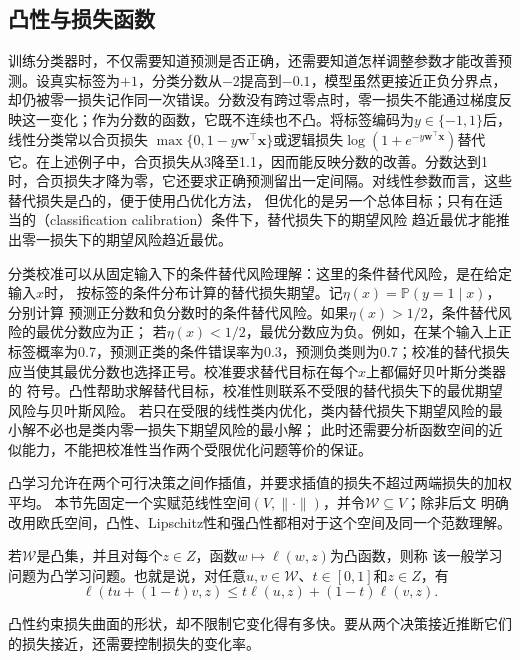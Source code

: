 \subsection{凸性与损失函数}

训练分类器时，不仅需要知道预测是否正确，还需要知道怎样调整参数才能改善预测。设真实标签为$+1$，分类分数从$-2$提高到$-0.1$，模型虽然更接近正负分界点，却仍被零一损失记作同一次错误。分数没有跨过零点时，零一损失不能通过梯度反映这一变化；作为分数的函数，它既不连续也不凸。将标签编码为$y\in\{-1,1\}$后，
线性分类常以合页损失
$\max\{0,1-y\bm w^\top\bm x\}$或逻辑损失$\log(1+e^{-y\bm w^\top\bm x})$替代它。在上述例子中，合页损失从3降至1.1，因而能反映分数的改善。分数达到1时，合页损失才降为零，它还要求正确预测留出一定间隔。对线性参数而言，这些替代损失是凸的，便于使用凸优化方法，
但优化的是另一个总体目标；只有在适当的（classification calibration）条件下，替代损失下的期望风险
趋近最优才能推出零一损失下的期望风险趋近最优。

分类校准可以从固定输入下的条件替代风险理解：这里的条件替代风险，是在给定输入$x$时，
按标签的条件分布计算的替代损失期望。记$\eta(x)=\mathbb P(y=1\mid x)$，分别计算
预测正分数和负分数时的条件替代风险。如果$\eta(x)>1/2$，条件替代风险的最优分数应为正；
若$\eta(x)<1/2$，最优分数应为负。例如，在某个输入上正标签概率为0.7，预测正类的条件错误率为0.3，预测负类则为0.7；校准的替代损失应当使其最优分数也选择正号。校准要求替代目标在每个$x$上都偏好贝叶斯分类器的
符号。凸性帮助求解替代目标，校准性则联系不受限的替代损失下的最优期望风险与贝叶斯风险。
若只在受限的线性类内优化，类内替代损失下期望风险的最小解不必也是类内零一损失下期望风险的最小解；
此时还需要分析函数空间的近似能力，不能把校准性当作两个受限优化问题等价的保证。

凸学习允许在两个可行决策之间作插值，并要求插值的损失不超过两端损失的加权平均。
本节先固定一个实赋范线性空间$(V,\|\cdot\|)$，并令$\mathcal W\subseteq V$；除非后文
明确改用欧氏空间，凸性、Lipschitz性和强凸性都相对于这个空间及同一个范数理解。

\begin{definition}[凸学习问题]
\label{def:convex-learning-problem}
若$\mathcal W$是凸集，并且对每个$z\in Z$，函数$w\mapsto\ell(w,z)$为凸函数，则称
该一般学习问题为凸学习问题。也就是说，对任意$u,v\in\mathcal W$、$t\in[0,1]$和$z\in Z$，有
\[
 \ell(tu+(1-t)v,z)\leq t\ell(u,z)+(1-t)\ell(v,z).
\]
\end{definition}

凸性约束损失曲面的形状，却不限制它变化得有多快。要从两个决策接近推断它们的损失接近，还需要控制损失的变化率。

